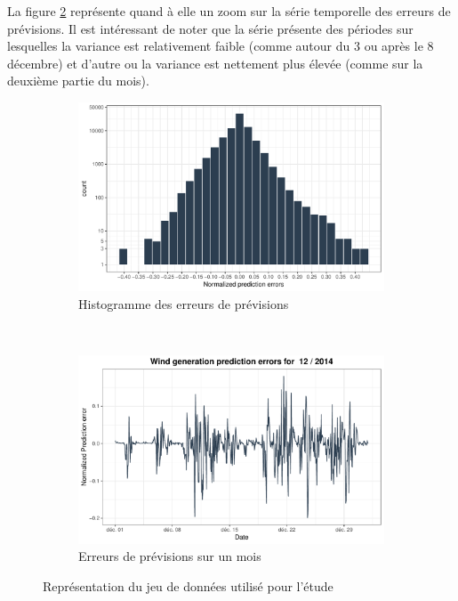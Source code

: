 \documentclass[12pt, french]{report}
\begin{document}
La figure \ref{fig::Data_Eolien_BPA_NormWindErrs_1Month} représente quand à elle un zoom sur la série temporelle des erreurs de prévisions. Il est intéressant de noter que la série présente des périodes sur lesquelles la variance est relativement faible (comme autour du 3 ou après le 8 décembre) et d'autre ou la variance est nettement plus élevée (comme sur la deuxième partie du mois).

\begin{figure}[htbp]
	\begin{center}
		\begin{subfigure}[b]{0.45\textwidth}
			\includegraphics[width=\textwidth]{Images/Data/Eolien/BPA/Hist_NormErr.pdf}
			\caption{Histogramme des erreurs de prévisions}
			\label{fig::Data_Eolien_BPA_HistNormERR}
		\end{subfigure}
		~
		\begin{subfigure}[b]{0.45\textwidth}
			\includegraphics[width=\textwidth]{Images/Data/Eolien/BPA/NormWindErrs_1Month.pdf}
			\caption{Erreurs de prévisions sur un mois}
			\label{fig::Data_Eolien_BPA_NormWindErrs_1Month}
		\end{subfigure}
		\caption{Représentation du jeu de données utilisé pour l'étude}
		\label{fig::Data_BPA_HitsZoom}	
	\end{center}
\end{figure}
\end{document}
